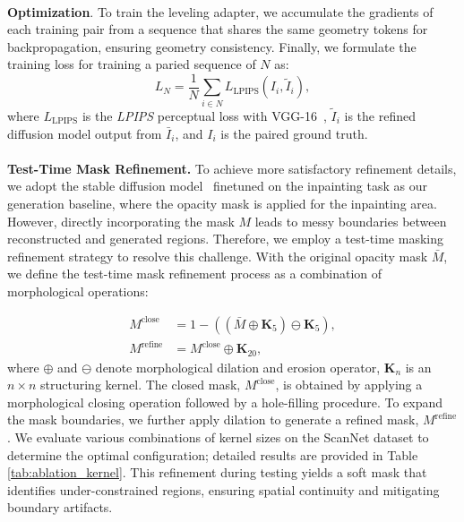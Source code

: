 \\
\noindent\textbf{Optimization}. To train the leveling adapter, we accumulate the gradients of each training pair from a sequence that shares the same geometry tokens for backpropagation, ensuring geometry consistency. Finally, we formulate the training loss for training a paried sequence of $N$ as:
\begin{equation}
    L_N = \frac{1}{N}\sum_{i\in N} L_{\text{LPIPS}}({I}_i, \tilde{I}_i),
\end{equation} where $L_{\text{LPIPS}}$ is the \textit{LPIPS} perceptual loss with VGG-16~\cite{simonyan2014very}, $\tilde{I}_i$ is the refined diffusion model output from $\bar{I}_i$, and ${I}_i$ is the paired ground truth.
\\
\\
\noindent\textbf{Test-Time Mask Refinement.} To achieve more satisfactory refinement details, we adopt the stable diffusion model~\cite{Rombach_2022_SD2} finetuned on the inpainting task as our generation baseline, where the opacity mask is applied for the inpainting area. However, directly incorporating the mask $M$ leads to messy boundaries between reconstructed and generated regions. Therefore, we employ a test-time masking refinement strategy to resolve this challenge. With the original opacity mask $\bar{M}$, we define the test-time mask refinement process as a combination of morphological operations:
    
\begin{equation}
    \begin{aligned}
    {M}^{\text{close}} &= 1-((\bar{M} \oplus \mathbf{K}_{5}) \ominus \mathbf{K}_{5}), \\
    {M}^{\text{refine}} &= {M}^{\text{close}} \oplus \mathbf{K}_{20},
    \end{aligned}
    \label{eq:mask}
\end{equation}
 where $\oplus$ and $\ominus$ denote morphological dilation and erosion operator, $\mathbf{K}_{n}$ is an $n\times n$ structuring kernel. The closed mask, $M^{\text{close}}$, is obtained by applying a morphological closing operation followed by a hole-filling procedure. To expand the mask boundaries, we further apply dilation to generate a refined mask, $M^{\text{refine}}$. We evaluate various combinations of kernel sizes on the ScanNet dataset to determine the optimal configuration; detailed results are provided in Table \ref{tab:ablation_kernel}. This refinement during testing yields a soft mask that identifies under-constrained regions, ensuring spatial continuity and mitigating boundary artifacts.


